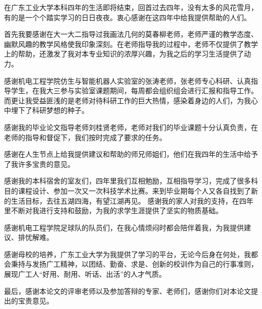 在广东工业大学本科四年的生活即将结束，回首过去四年，没有太多的风花雪月，有的是一个个踏实学习的日日夜夜。衷心感谢在这四年中给我提供帮助的人们。\par
首先我要感谢在大一大二指导过我画法几何的莫春柳老师，老师严谨的教学态度、幽默风趣的教学风格使我印象深刻。在老师指导我的过程中，老师不仅提供了教学上的帮助，还激发了我对本专业知识的浓厚兴趣，为我之后的学习生活提供了动力。\par
感谢机电工程学院仿生与智能机器人实验室的张涛老师，张老师专心科研、认真指导学生，在我大三参与实验室课题期间，每周都会组织组会进行汇报和指导工作。而更让我受益匪浅的是老师对待科研工作的巨大热情，感染着身边的人们，为我心中埋下了科研梦想的种子。\par
感谢我的毕业论文指导老师刘桂贤老师，老师对我们的毕业课题十分认真负责，在老师的指导和督促下，我们按时完成了要求的任务。\par
感谢在人生节点上给我提供建议和帮助的师兄师姐们，他们在我四年的生活中给予了我许多宝贵的意见。\par
感谢我的本科宿舍的室友们，四年里我们互相勉励，互相指导学习，完成了很多科目的课程设计、参加一次又一次科技学术比赛。来到毕业期每个人又各自找到了新的生活目标，去往五湖四海，有望江湖再见。
感谢我的家人对我的支持，在四年里不断对我进行支持和鼓励，为我的求学生涯提供了坚实的物质基础。\par
感谢机电工程学院足球队的队员们，在我心情烦闷时都会陪伴着我，为我提供建议、排忧解难。\par
感谢母校的培养，广东工业大学为我提供了学习的平台，无论今后身在何处，我都会秉持与发扬广工精神，以团结、勤奋、求是、创新的校训作为自己的行事准则，展现广工人“好用、耐用、听话、出活”的人才气质。\par
最后，感谢本论文的评审老师以及参加答辩的专家、老师们，感谢你们对本论文提出的宝贵意见。